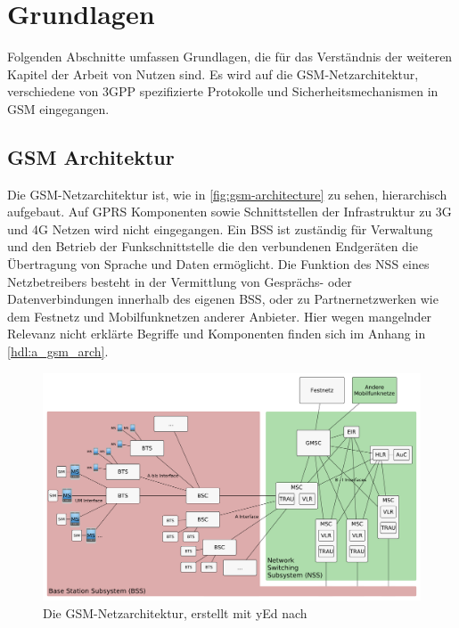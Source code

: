 \chapter{Grundlagen} \label{hdl:einfuehrung-gsm}

Folgenden Abschnitte umfassen Grundlagen, die für das Verständnis der weiteren Kapitel der Arbeit von Nutzen sind. Es wird auf die \ac{GSM}-Netzarchitektur, verschiedene von \ac{3GPP} spezifizierte Protokolle und Sicherheitsmechanismen in \ac{GSM} eingegangen.

\section{GSM Architektur} \label{hdl:einfuehrung-gsm_architektur}


Die \ac{GSM}-Netzarchitektur ist, wie in \autoref{fig:gsm-architecture} zu sehen, hierarchisch aufgebaut. Auf \ac{GPRS} Komponenten sowie Schnittstellen der Infrastruktur zu 3G und 4G Netzen wird nicht eingegangen. Ein \ac{BSS} ist zuständig für Verwaltung und den Betrieb der Funkschnittstelle die den verbundenen Endgeräten die Übertragung von Sprache und Daten ermöglicht. Die Funktion des \ac{NSS} eines Netzbetreibers besteht in der Vermittlung von Gesprächs- oder Datenverbindungen innerhalb des eigenen \ac{BSS}, oder zu Partnernetzwerken wie dem Festnetz und Mobilfunknetzen anderer Anbieter. Hier wegen mangelnder Relevanz nicht erklärte Begriffe und Komponenten finden sich im Anhang in \autoref{hdl:a_gsm_arch}.

\begin{figure}[H]
	\centering \includegraphics[width=1.0\linewidth]{figures/gsm_network_architecture.pdf}
	  \caption[Die GSM Netzarchitektur]{Die \ac{GSM}-Netzarchitektur, erstellt mit yEd nach \citep{schnabel2003kommunikationstechnik}} \label{fig:gsm-architecture} 
\end{figure}


